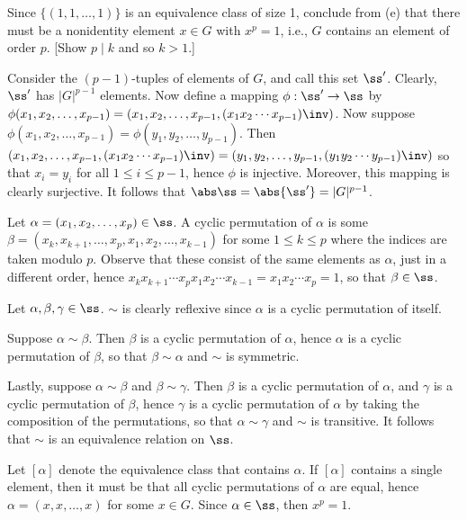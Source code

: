 \begin{problems}
\begin{problems}[resume]
        \item Since $\{(1, 1, \dots, 1)\}$ is an equivalence class of size 1, conclude from (e) that there must be a nonidentity element $x \in G$ with $x^p = 1$, i.e., $G$ contains an element of order $p$. [Show $p \mid k$ and so $k > 1$.]
    \end{problems}
    \begin{solalph}
        \item Consider the $(p - 1)$-tuples of elements of $G$, and call this set $\ss'$. Clearly, $\ss'$ has $|G|^{p-1}$ elements. Now define a mapping $\phi : \ss' \to \ss$ by $\phi(x_1, x_2, \dots, x_{p-1}) = (x_1, x_2, \dots, x_{p-1}, (x_1x_2 \cdots x_{p-1})\inv)$. Now suppose $\phi(x_1, x_2, \dots, x_{p-1}) = \phi(y_1, y_2, \dots, y_{p-1})$. Then $(x_1, x_2, \dots, x_{p-1}, (x_1x_2 \cdots x_{p-1})\inv) = (y_1, y_2, \dots, y_{p-1}, (y_1y_2 \cdots y_{p-1})\inv)$ so that $x_i = y_i$ for all $1 \leq i \leq p - 1$, hence $\phi$ is injective. Moreover, this mapping is clearly surjective. It follows that $\abs\ss = \abs{\ss'} = |G|^{p-1}$.
        \item Let $\alpha = (x_1, x_2, \dots, x_p) \in \ss$. A cyclic permutation of $\alpha$ is some $\beta = (x_k, x_{k+1}, \dots, x_p, x_1, x_2, \dots, x_{k-1})$ for some $1 \leq k \leq p$ where the indices are taken modulo $p$. Observe that these consist of the same elements as $\alpha$, just in a different order, hence $x_k x_{k+1} \cdots x_p x_1 x_2 \cdots x_{k-1} = x_1 x_2 \cdots x_p = 1$, so that $\beta \in \ss$.
        \item Let $\alpha, \beta, \gamma \in \ss$. $\sim$ is clearly reflexive since $\alpha$ is a cyclic permutation of itself. 
        
        Suppose $\alpha \sim \beta$. Then $\beta$ is a cyclic permutation of $\alpha$, hence $\alpha$ is a cyclic permutation of $\beta$, so that $\beta \sim \alpha$ and $\sim$ is symmetric. 
        
        Lastly, suppose $\alpha \sim \beta$ and $\beta \sim \gamma$. Then $\beta$ is a cyclic permutation of $\alpha$, and $\gamma$ is a cyclic permutation of $\beta$, hence $\gamma$ is a cyclic permutation of $\alpha$ by taking the composition of the permutations, so that $\alpha \sim \gamma$ and $\sim$ is transitive. It follows that $\sim$ is an equivalence relation on $\ss$.
        \item \rightimp Let $[\alpha]$ denote the equivalence class that contains $\alpha$. If $[\alpha]$ contains a single element, then it must be that all cyclic permutations of $\alpha$ are equal, hence $\alpha = (x, x, \dots, x)$ for some $x \in G$. Since $\alpha \in \ss$, then $x^p = 1$.
        

\end{solalph}
\end{problems}
